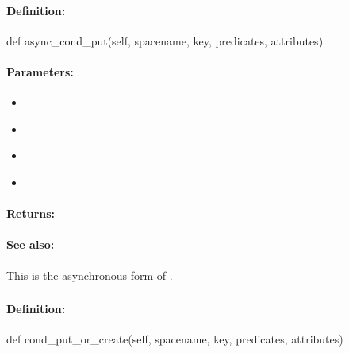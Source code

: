 \paragraph{Definition:}
\begin{pythoncode}
def async_cond_put(self, spacename, key, predicates, attributes)
\end{pythoncode}

\paragraph{Parameters:}
\begin{itemize}[noitemsep]
\item {}\\

\item {}\\

\item {}\\

\item {}\\

\end{itemize}

\paragraph{Returns:}


\paragraph{See also:}  This is the asynchronous form of .

\pagebreak
\subsubsection{}
\label{api:python:cond_put_or_create}


\paragraph{Definition:}
\begin{pythoncode}
def cond_put_or_create(self, spacename, key, predicates, attributes)
\end{pythoncode}

